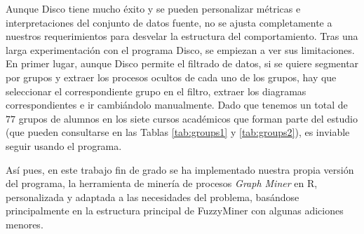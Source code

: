Aunque Disco tiene mucho éxito y se pueden personalizar métricas e interpretaciones del conjunto de datos fuente, no se ajusta completamente a nuestros requerimientos para desvelar la estructura del comportamiento. Tras una larga experimentación con el programa Disco, se empiezan a ver sus limitaciones. En primer lugar, aunque Disco permite el filtrado de datos, si se quiere segmentar por grupos y extraer los procesos ocultos de cada uno de los grupos, hay que seleccionar el correspondiente grupo en el filtro, extraer los diagramas correspondientes e ir cambiándolo manualmente. Dado que tenemos un total de $77$ grupos de alumnos en los siete cursos académicos que forman parte del estudio (que pueden consultarse en las Tablas \ref{tab:groups1} y \ref{tab:groups2}), es inviable seguir usando el programa.

Así pues, en este trabajo fin de grado se ha implementado nuestra propia versión del programa, la herramienta de minería de procesos \emph{Graph Miner} en R, personalizada y adaptada a las necesidades del problema, basándose principalmente en la estructura principal de FuzzyMiner \cite{gunther2007fuzzy} con algunas adiciones menores.